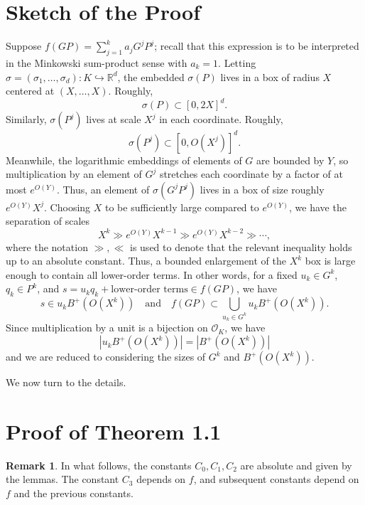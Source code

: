 \documentclass[11pt]{amsart}
\theoremstyle{plain}
\theoremstyle{definition}\newtheorem{remark}[theorem]{Remark}
\theoremstyle{definition}\newtheorem*{remark*}{Remark}
\theoremstyle{definition}\newtheorem{definition}[theorem]{Definition}
\theoremstyle{definition}\newtheorem*{definition*}{Definition}
\theoremstyle{definition}\newtheorem*{idea}{Idea}
\theoremstyle{definition}\newtheorem*{comments}{Comment}
\theoremstyle{definition}\newtheorem{example}[theorem]{Example}
\theoremstyle{definition}\newtheorem*{example*}{Example}
\newcommand{\0}{\varnothing} %
\def\R{\mathbb{R}} %
\begin{document}
\section{Sketch of the Proof}
Suppose $f(GP)=\sum_{j=1}^k a_j G^jP^j$; recall that this expression is to be interpreted in the Minkowski sum-product sense with $a_k=1$. Letting $\sigma=(\sigma_1,\dots,\sigma_d): K\hookrightarrow \R^d$, the embedded $\sigma(P)$ lives in a box of radius $X$ centered at $(X,\dots,X)$. Roughly, 
\[
\sigma(P)\subset [0,2X]^d.
\]
Similarly, $\sigma(P^j)$ lives at scale $X^j$ in each coordinate. Roughly,
\[
\sigma(P^j)\subset[0,O(X^j)]^d.
\]
Meanwhile, the logarithmic embeddings of elements of $G$ are bounded by $Y$, so multiplication by an element of $G^j$ stretches each coordinate by a factor of at most $e^{O(Y)}$. Thus, an element of $\sigma(G^jP^j)$ lives in a box of size roughly $e^{O(Y)}X^j$. Choosing $X$ to be sufficiently large compared to $e^{O(Y)}$, we have the separation of scales
\[
X^k\gg e^{O(Y)}X^{k-1}\gg e^{O(Y)}X^{k-2}\gg\cdots,
\]
where the notation $\gg,\ll$ is used to denote that the relevant inequality holds up to an absolute constant. Thus, a bounded enlargement of the $X^k$ box is large enough to contain all lower-order terms. In other words, for a fixed $u_k\in G^k$, $q_k\in P^k$, and $s=u_kq_k+\text{lower-order terms}\in f(GP)$, we have
\[
s\in u_kB^+(O(X^k))\quad\text{and}\quad f(GP)\subset\bigcup_{u_k\in G^k}u_k B^+(O(X^k)).
\]
Since multiplication by a unit is a bijection on $\mathcal O_K$, we have 
\[
|u_kB^+(O(X^k))|=|B^+(O(X^k))|
\]
and we are reduced to considering the sizes of $G^k$ and $B^+(O(X^k))$. 

We now turn to the details. 

\section{Proof of Theorem 1.1}
\begin{remark}
    In what follows, the constants $C_0,C_1,C_2$ are absolute and given by the lemmas. The constant $C_3$ depends on $f$, and subsequent constants depend on $f$ and the previous constants. 
\end{remark}
\end{document}
